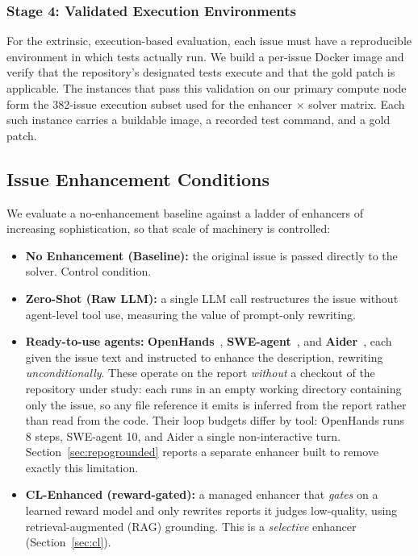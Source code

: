 \documentclass[journal]{IEEEtran}
\newcommand{\ourmethod}{CL-Enhanced}
\begin{document}
\subsubsection{Stage 4: Validated Execution Environments}
For the extrinsic, execution-based evaluation, each issue must have a reproducible environment in which tests actually run. We build a per-issue Docker image and verify that the repository's designated tests execute and that the gold patch is applicable. The instances that pass this validation on our primary compute node form the 382-issue execution subset used for the enhancer $\times$ solver matrix. Each such instance carries a buildable image, a recorded test command, and a gold patch.




\subsection{Issue Enhancement Conditions}

We evaluate a no-enhancement baseline against a ladder of enhancers of increasing sophistication, so that scale of machinery is controlled:
\begin{itemize}
\item \textbf{No Enhancement (Baseline):} the original issue is passed directly to the solver. Control condition.
\item \textbf{Zero-Shot (Raw LLM):} a single LLM call restructures the issue without agent-level tool use, measuring the value of prompt-only rewriting.
\item \textbf{Ready-to-use agents:} \textbf{OpenHands}~\cite{wang2024openhands}, \textbf{SWE-agent}~\cite{yang2024swe}, and \textbf{Aider}~\cite{aider2024}, each given the issue text and instructed to enhance the description, rewriting \emph{unconditionally}. These operate on the report \emph{without} a checkout of the repository under study: each runs in an empty working directory containing only the issue, so any file reference it emits is inferred from the report rather than read from the code. Their loop budgets differ by tool: OpenHands runs 8 steps, SWE-agent 10, and Aider a single non-interactive turn. Section~\ref{sec:repogrounded} reports a separate enhancer built to remove exactly this limitation.
\item \textbf{\ourmethod{} (reward-gated):} a managed enhancer that \emph{gates} on a learned reward model and only rewrites reports it judges low-quality, using retrieval-augmented (RAG) grounding. This is a \emph{selective} enhancer (Section~\ref{sec:cl}).
\end{itemize}
\end{document}
